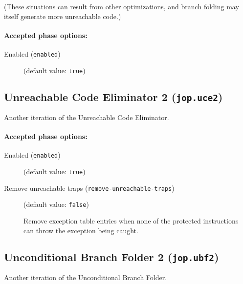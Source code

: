 \documentclass{article}
\begin{document}
(These situations can result from other optimizations, and branch
folding may itself generate more unreachable code.)


\paragraph{Accepted phase options:} 

\begin{description}

\item[Enabled ({\tt enabled})]
(default value: {\tt true})






\end{description}

\subsection{Unreachable Code Eliminator 2 ({\tt jop.uce2})}

Another iteration of the Unreachable Code Eliminator.


\paragraph{Accepted phase options:} 

\begin{description}

\item[Enabled ({\tt enabled})]
(default value: {\tt true})






\item[Remove unreachable traps ({\tt remove-unreachable-traps})]
(default value: {\tt false})




Remove exception table entries when none of the protected instructions can
throw the exception being caught.



\end{description}

\subsection{Unconditional Branch Folder 2 ({\tt jop.ubf2})}

Another iteration of the Unconditional Branch Folder.
\end{document}
